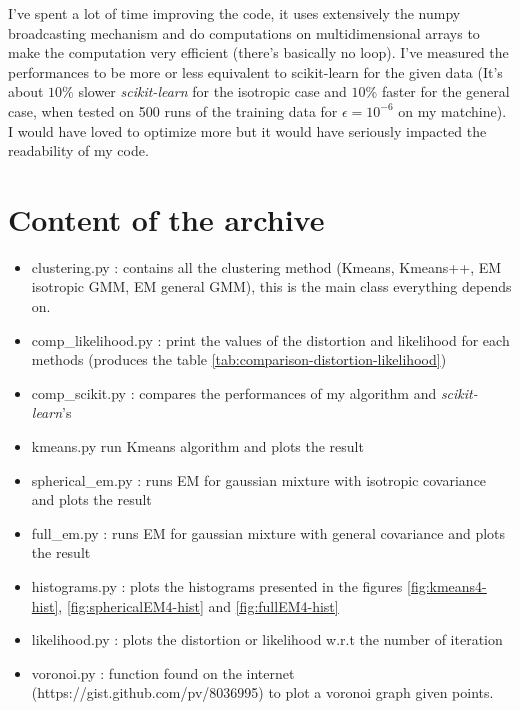 \documentclass[a4paper, 11pt]{article}
\begin{document}
I've spent a lot of time improving the code, it uses extensively the
numpy broadcasting mechanism and do computations on multidimensional
arrays to make the computation very efficient (there's basically no
loop). I've measured the performances to be more or less equivalent to
scikit-learn for the given data (It's about $10\%$ slower
\emph{scikit-learn} for the isotropic case and $10\%$ faster for the
general case, when tested on 500 runs of the training data for
$\epsilon = 10^{-6}$ on my matchine). I would have loved to optimize
more but it would have seriously impacted the readability of my code.

\section{Content of the archive}

\begin{itemize}
\item clustering.py : contains all the clustering method (Kmeans,
  Kmeans++, EM isotropic GMM, EM general GMM), this is the main class
  everything depends on.
\item comp\_likelihood.py : print the values of the distortion and likelihood
  for each methods (produces the table \ref{tab:comparison-distortion-likelihood})
\item comp\_scikit.py : compares the performances of my algorithm and
  \emph{scikit-learn}'s
\item kmeans.py run Kmeans algorithm and plots the result
\item spherical\_em.py : runs EM for gaussian mixture with isotropic
  covariance and plots the result
\item full\_em.py : runs EM for gaussian mixture with general
  covariance and plots the result
\item histograms.py : plots the histograms presented in the figures
  \ref{fig:kmeans4-hist}, \ref{fig:sphericalEM4-hist} and
  \ref{fig:fullEM4-hist}
\item likelihood.py : plots the distortion or likelihood w.r.t the
  number of iteration
\item voronoi.py : function found on the internet
  (https://gist.github.com/pv/8036995) to plot a voronoi graph given
  points.
\end{itemize}
\end{document}
